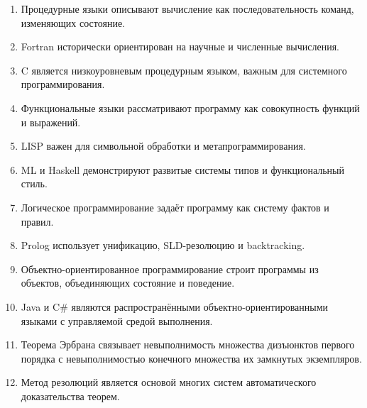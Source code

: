 \documentclass[12pt,a4paper]{article}
\begin{document}
\begin{enumerate}
    \item Процедурные языки описывают вычисление как последовательность команд, изменяющих состояние.
    \item Fortran исторически ориентирован на научные и численные вычисления.
    \item C является низкоуровневым процедурным языком, важным для системного программирования.
    \item Функциональные языки рассматривают программу как совокупность функций и выражений.
    \item LISP важен для символьной обработки и метапрограммирования.
    \item ML и Haskell демонстрируют развитые системы типов и функциональный стиль.
    \item Логическое программирование задаёт программу как систему фактов и правил.
    \item Prolog использует унификацию, SLD-резолюцию и backtracking.
    \item Объектно-ориентированное программирование строит программы из объектов, объединяющих состояние и поведение.
    \item Java и C\# являются распространёнными объектно-ориентированными языками с управляемой средой выполнения.
    \item Теорема Эрбрана связывает невыполнимость множества дизъюнктов первого порядка с невыполнимостью конечного множества их замкнутых экземпляров.
    \item Метод резолюций является основой многих систем автоматического доказательства теорем.
\end{enumerate}
\end{document}
